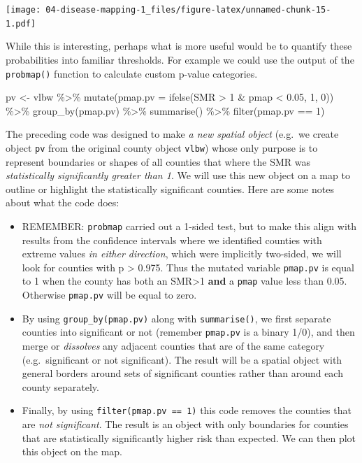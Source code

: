 \documentclass[
]{book}
\newenvironment{Shaded}{\begin{snugshade}}{\end{snugshade}}
\newcommand{\AttributeTok}[1]{\textcolor[rgb]{0.77,0.63,0.00}{#1}}
\newcommand{\DecValTok}[1]{\textcolor[rgb]{0.00,0.00,0.81}{#1}}
\newcommand{\FloatTok}[1]{\textcolor[rgb]{0.00,0.00,0.81}{#1}}
\newcommand{\FunctionTok}[1]{\textcolor[rgb]{0.00,0.00,0.00}{#1}}
\newcommand{\NormalTok}[1]{#1}
\newcommand{\OtherTok}[1]{\textcolor[rgb]{0.56,0.35,0.01}{#1}}
\newcommand{\SpecialCharTok}[1]{\textcolor[rgb]{0.00,0.00,0.00}{#1}}
\providecommand{\tightlist}{%
  \setlength{\itemsep}{0pt}\setlength{\parskip}{0pt}}
\begin{document}
\texttt{[image: 04-disease-mapping-1\_files/figure-latex/unnamed-chunk-15-1.pdf]}

While this is interesting, perhaps what is more useful would be to quantify these probabilities into familiar thresholds. For example we could use the output of the \texttt{probmap()} function to calculate custom p-value categories.

\begin{Shaded}
\begin{Highlighting}[]
\NormalTok{pv }\OtherTok{\textless{}{-}}\NormalTok{ vlbw }\SpecialCharTok{\%\textgreater{}\%}
  \FunctionTok{mutate}\NormalTok{(}\AttributeTok{pmap.pv =} \FunctionTok{ifelse}\NormalTok{(SMR }\SpecialCharTok{\textgreater{}} \DecValTok{1} \SpecialCharTok{\&}\NormalTok{ pmap }\SpecialCharTok{\textless{}} \FloatTok{0.05}\NormalTok{, }\DecValTok{1}\NormalTok{, }\DecValTok{0}\NormalTok{)) }\SpecialCharTok{\%\textgreater{}\%}
  \FunctionTok{group\_by}\NormalTok{(pmap.pv) }\SpecialCharTok{\%\textgreater{}\%}
  \FunctionTok{summarise}\NormalTok{() }\SpecialCharTok{\%\textgreater{}\%}
  \FunctionTok{filter}\NormalTok{(pmap.pv }\SpecialCharTok{==} \DecValTok{1}\NormalTok{)}
\end{Highlighting}
\end{Shaded}

The preceding code was designed to make \emph{a new spatial object} (e.g.~we create object \texttt{pv} from the original county object \texttt{vlbw}) whose only purpose is to represent boundaries or shapes of all counties that where the SMR was \emph{statistically significantly greater than 1}. We will use this new object on a map to outline or highlight the statistically significant counties. Here are some notes about what the code does:

\begin{itemize}
\tightlist
\item
  REMEMBER: \texttt{probmap} carried out a 1-sided test, but to make this align with results from the confidence intervals where we identified counties with extreme values \emph{in either direction}, which were implicitly two-sided, we will look for counties with p \textgreater{} 0.975. Thus the mutated variable \texttt{pmap.pv} is equal to 1 when the county has both an SMR\textgreater1 \textbf{and} a \texttt{pmap} value less than 0.05. Otherwise \texttt{pmap.pv} will be equal to zero.
\item
  By using \texttt{group\_by(pmap.pv)} along with \texttt{summarise()}, we first separate counties into significant or not (remember \texttt{pmap.pv} is a binary 1/0), and then merge or \emph{dissolves} any adjacent counties that are of the same category (e.g.~significant or not significant). The result will be a spatial object with general borders around sets of significant counties rather than around each county separately.
\item
  Finally, by using \texttt{filter(pmap.pv\ ==\ 1)} this code removes the counties that are \emph{not significant}. The result is an object with only boundaries for counties that are statistically significantly higher risk than expected. We can then plot this object on the map.
\end{itemize}
\end{document}
